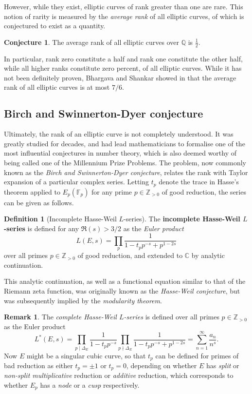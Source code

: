 \documentclass{article}
\newcommand{\F}{\mathbb{F}}
\newcommand{\Z}{\mathbb{Z}}
\newcommand{\Q}{\mathbb{Q}}
\newcommand{\C}{\mathbb{C}}
\newcommand{\rb}[1]{\left( #1 \right)}
\theoremstyle{definition}\newtheorem*{definition}{Definition}
\theoremstyle{definition}\newtheorem*{example}{Example}
\theoremstyle{definition}\newtheorem*{remark}{Remark}
\newtheorem{conjecture}[proposition]{Conjecture}
\begin{document}
However, while they exist, elliptic curves of rank greater than one are rare. This notion of rarity is measured by the \emph{average rank} of all elliptic curves, of which is conjectured to exist as a quantity.

\begin{conjecture}
The average rank of all elliptic curves over $ \Q $ is $ \tfrac{1}{2} $.
\end{conjecture}

In particular, rank zero constitute a half and rank one constitute the other half, while all higher ranks constitute zero percent, of all elliptic curves. While it has not been definitely proven, Bhargava and Shankar showed in \cite{rankaverage} that the average rank of all elliptic curves is at most $ 7 / 6 $.

\pagebreak

\subsection{Birch and Swinnerton-Dyer conjecture}

Ultimately, the rank of an elliptic curve is not completely understood. It was greatly studied for decades, and had lead mathematicians to formalise one of the most influential conjectures in number theory, which is also deemed worthy of being called one of the Millennium Prize Problems. The problem, now commonly known as the \emph{Birch and Swinnerton-Dyer conjecture}, relates the rank with Taylor expansion of a particular complex series. Letting $ t_p $ denote the trace in Hasse's theorem applied to $ E_p\rb{\F_p} $ for any prime $ p \in \Z_{> 0} $ of good reduction, the series can be given as follows.

\begin{definition}[Incomplete Hasse-Weil $ L $-series]
The \textbf{incomplete Hasse-Weil $ L $-series} is defined for any $ \Re\rb{s} > 3 / 2 $ as the \emph{Euler product}
$$ L\rb{E, s} = \prod_p \dfrac{1}{1 - t_pp^{-s} + p^{1 - 2s}} $$
over all primes $ p \in \Z_{> 0} $ of good reduction, and extended to $ \C $ by analytic continuation.
\end{definition}

This analytic continuation, as well as a functional equation similar to that of the Riemann zeta function, was originally known as the \emph{Hasse-Weil conjecture}, but was subsequently implied by the \emph{modularity theorem}.

\begin{remark}
The \emph{complete Hasse-Weil $ L $-series} is defined over all primes $ p \in \Z_{> 0} $ as the Euler product
$$ L^*\rb{E, s} = \prod_{p \mid \Delta_E} \dfrac{1}{1 - t_pp^{-s}} \prod_{p \nmid \Delta_E} \dfrac{1}{1 - t_pp^{-s} + p^{1 - 2s}} = \sum_{n = 1}^\infty \dfrac{a_n}{n^s}. $$
Now $ E $ might be a singular cubic curve, so that $ t_p $ can be defined for primes of bad reduction as either $ t_p = \pm 1 $ or $ t_p = 0 $, depending on whether $ E $ has \emph{split} or \emph{non-split multiplicative} reduction or \emph{additive} reduction, which corresponds to whether $ E_p $ has a \emph{node} or a \emph{cusp} respectively.
\end{remark}
\end{document}
